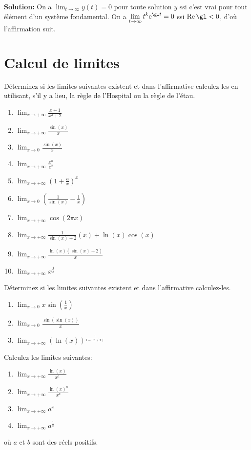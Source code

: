 \bigskip
{\bf Solution:}
On a 
$\displaystyle \lim_{t \to \infty} y(t) = 0$ pour toute solution $y$ ssi c'est vrai pour tout élément d'un système fondamental.
On a $\displaystyle \lim_{t \to \infty} t^k {\rm e}^{\gl t}=0$ ssi ${\rm Re }\,\gl <0$,
d'où l'affirmation suit.






\section{Calcul de limites}

\exerNico Déterminez si les limites suivantes existent et dans
l'affirmative calculez les en utilisant, s'il y a lieu, la règle de
l'Hospital ou la règle de l'étau.
\begin{enumerate}
\item $  \lim_{x \rightarrow  +\infty} \frac{x+1}{x^2+2} $
\item $  \lim_{x \rightarrow  +\infty} \frac{\sin(x)}{x} $
\item $  \lim_{x \rightarrow  0} \frac{\sin(x)}{x} $
\item $  \lim_{x \rightarrow  +\infty}  \frac{x ^n}{e ^x} $
\item $  \lim_{x \rightarrow  +\infty} (1 + \frac{a}{x})^x $
\item $  \lim_{x \rightarrow  0} (\frac{1}{\sin(x)} - \frac{1}{x} )$
\item $  \lim_{x \rightarrow  +\infty} \cos( 2 \pi x) $
\item $  \lim_{x \rightarrow  +\infty} \frac{1}{\sin(x)+2}(x) +\ln(x)\cos(x) $
\item $  \lim_{x \rightarrow  +\infty} \frac{ \ln(x)(\sin(x) +2)}{x} $
\item $  \lim_{x \rightarrow  +\infty} x ^\frac{1}{x} $
\end{enumerate}

\exerNico Déterminez si les limites suivantes existent et dans
l'affirmative calculez-les.
\begin{enumerate}
\item $  \lim_{x \rightarrow  0} x \sin(\frac{1}{x}) $
\item $  \lim_{x \rightarrow  0} \frac{\sin(\sin(x))}{x} $
\item $  \lim_{x \rightarrow  +\infty} (\ln(x))^\frac{1}{1 - \ln(x)}$
\end{enumerate}

\exerNico Calculez les limites suivantes:
\begin{enumerate}
\item $  \lim_{x \rightarrow  +\infty} \frac{\ln(x)}{x ^a} $
\item $  \lim_{x \rightarrow  +\infty} \frac{\ln(x)^a}{x ^b} $
\item $  \lim_{x \rightarrow  +\infty} a ^x $
\item $  \lim_{x \rightarrow  +\infty} a ^\frac{1}{x} $
\end{enumerate}
où $a$ et $b$ sont des réels positifs.
%

